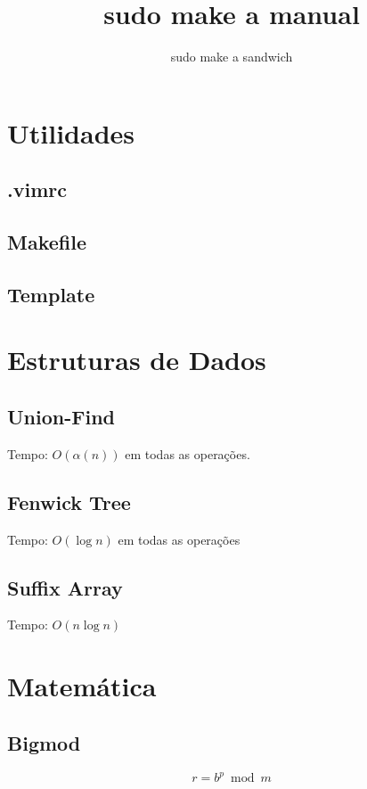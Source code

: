 \documentclass[12pt,a4paper]{article}
\title{sudo make a manual}
\author{sudo make a sandwich}
\begin{document}
	\twocolumn
	\maketitle
	\tableofcontents
	\onecolumn

	\section{Utilidades}
		\subsection{.vimrc}
			
		\subsection{Makefile}
			
		\subsection{Template}
			
	
	\section{Estruturas de Dados}
		\subsection{Union-Find}
			Tempo: \( O(\alpha(n)) \) em todas as operações.
			
		\subsection{Fenwick Tree}
			Tempo: \( O(\log n) \) em todas as operações
			
		\subsection{Suffix Array}
			Tempo: \( O(n \log n) \)
			

	\section{Matemática}
		\subsection{Bigmod}
			\[ r = b^p \bmod m \]
			
\end{document}
